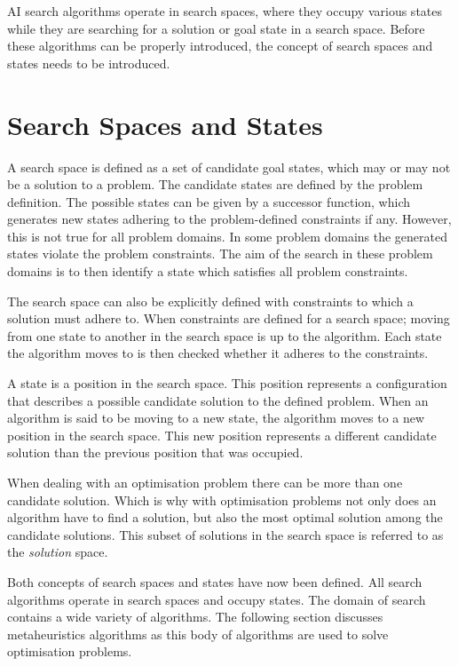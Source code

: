 \gls{AI} search algorithms operate in search spaces, where they occupy various states while they are searching for a solution or goal state in a search space. Before these algorithms can be properly introduced, the concept of search spaces and states needs to be introduced.

\section{Search Spaces and States}
A search space is defined as a set of candidate goal states, which may or may not be a solution to a problem\cite{AIModernApproach}. The candidate states are defined by the problem definition\cite{AIModernApproach}. The possible states can be given by a successor function, which generates new states adhering to the problem-defined constraints if any\cite{AIModernApproach}. However, this is not true for all problem domains. In some problem domains the generated states violate the problem constraints. The aim of the search in these problem domains is to then identify a state which satisfies all problem constraints.

The search space can also be explicitly defined with constraints to which a solution must adhere to\cite{AIModernApproach}. When constraints are defined for a search space; moving from one state to another in the search space is up to the algorithm\cite{AIModernApproach}. Each state the algorithm moves to is then checked whether it adheres to the constraints\cite{AIModernApproach}.

A state is a position in the search space\cite{AIModernApproach}. This position represents a configuration that describes a possible candidate solution to the defined problem\cite{AIModernApproach}. When an algorithm is said to be moving to a new state, the algorithm moves to a new position in the search space\cite{AIModernApproach}. This new position represents a different candidate solution than the previous position that was occupied\cite{AIModernApproach}.

When dealing with an optimisation problem there can be more than one candidate solution\cite{AIModernApproach}. Which is why with optimisation problems not only does an algorithm have to find a solution, but also the most optimal solution among the candidate solutions\cite{AIModernApproach}. This subset of solutions in the search space is referred to as the \emph{solution} space.

Both concepts of search spaces and states have now been defined. All search algorithms operate in search spaces and occupy states. The domain of search contains a wide variety of algorithms. The following section discusses metaheuristics algorithms as this body of algorithms are used to solve optimisation problems.

